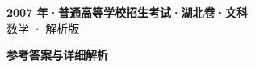 \documentclass[zihao=-4, a4paper]{ctexart}
\begin{document}
\begin{center}
  {\Large\bfseries 2007 年·普通高等学校招生考试·湖北卷·文科}\\[4pt]
  {\large 数学 · 解析版}
\end{center}
\medskip
{}

\clearpage
{}
\begin{center}{\Large\bfseries 参考答案与详细解析}\end{center}
\medskip

\end{document}
